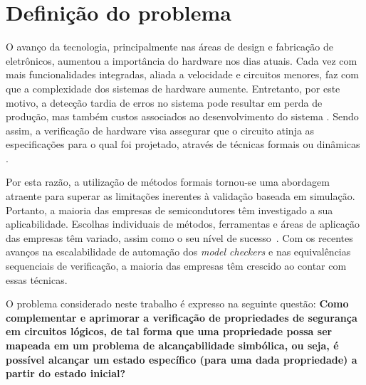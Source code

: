 \section{Definição do problema}

O avanço da tecnologia, principalmente nas áreas de design e fabricação de eletrônicos, aumentou a importância do hardware nos dias atuais. Cada vez com mais funcionalidades integradas, aliada a velocidade e circuitos menores, faz com que a complexidade dos sistemas de hardware aumente. Entretanto, por este motivo, a detecção tardia de erros no sistema pode resultar em perda de produção, mas também custos associados ao desenvolvimento do sistema \cite{gupta1992formal}. Sendo assim, a verificação de hardware visa assegurar que o circuito atinja as especificações para o qual foi projetado, através de técnicas formais ou dinâmicas \cite{boule2007efficient}.

\par
Por esta razão, a utilização de métodos formais tornou-se uma abordagem atraente para superar as limitações inerentes à validação baseada em simulação. Portanto, a maioria das empresas de semicondutores têm investigado a sua aplicabilidade. Escolhas individuais de métodos, ferramentas e áreas de aplicação das empresas têm variado, assim como o seu nível de sucesso~\cite{cabodi2016hardware}. Com os recentes avanços na escalabilidade de automação dos \textit{model checkers} e nas equivalências sequenciais de verificação, a maioria das empresas têm crescido ao contar com essas técnicas\cite{clarke2008birth}.

O problema considerado neste trabalho é expresso na seguinte questão: \textbf{Como complementar e aprimorar a verificação de propriedades de segurança em circuitos lógicos, de tal forma que uma propriedade possa ser mapeada em um problema de alcançabilidade simbólica, ou seja, é possível alcançar um estado específico (para uma dada propriedade) a partir do estado inicial?}

